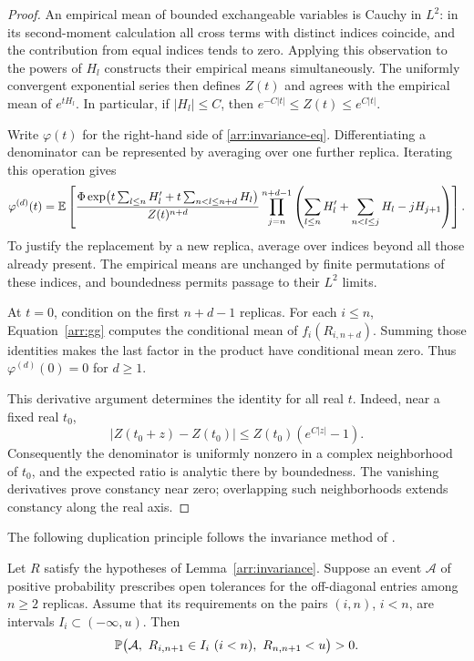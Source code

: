 \begin{proof}
An empirical mean of bounded exchangeable variables is Cauchy in $L^2$:
in its second-moment calculation all cross terms with distinct indices
coincide, and the contribution from equal indices tends to zero. Applying
this observation to the powers of $H_l$ constructs their empirical means
simultaneously. The uniformly convergent exponential series then defines
$Z(t)$ and agrees with the empirical mean of $e^{tH_l}$. In particular,
if $|H_l|\leq C$, then
$e^{-C|t|}\leq Z(t)\leq e^{C|t|}$.

Write $\varphi(t)$ for the right-hand side of
\eqref{arr:invariance-eq}. Differentiating a denominator can be represented
by averaging over one further replica. Iterating this operation gives
\[
 \varphi^{(d)}(t)
 =\mathbb E\left[
 \frac{\Phi\exp\bigl(t\sum_{l\leq n}H'_l
                   +t\sum_{n<l\leq n+d}H_l\bigr)}
      {Z(t)^{n+d}}
 \prod_{j=n}^{n+d-1}
 \left(\sum_{l\leq n}H'_l+
       \sum_{n<l\leq j}H_l-jH_{j+1}\right)
 \right].
\]
To justify the replacement by a new replica, average over indices beyond
all those already present. The empirical means are unchanged by finite
permutations of these indices, and boundedness permits passage to their
$L^2$ limits.

At $t=0$, condition on the first $n+d-1$ replicas. For each
$i\leq n$, Equation~\eqref{arr:gg} computes the conditional mean of
$f_i(R_{i,n+d})$. Summing those identities makes the last factor in the
product have conditional mean zero. Thus $\varphi^{(d)}(0)=0$ for
$d\geq1$.

This derivative argument determines the identity for all real $t$.
Indeed, near a fixed real $t_0$,
\[
 |Z(t_0+z)-Z(t_0)|
 \leq Z(t_0)(e^{C|z|}-1).
\]
Consequently the denominator is uniformly nonzero in a complex
neighborhood of $t_0$, and the expected ratio is analytic there by
boundedness. The vanishing derivatives prove constancy near zero;
overlapping such neighborhoods extends constancy along the real axis.
\end{proof}

The following duplication principle follows the invariance method of
\cite[Theorem~4 in the cited arXiv version]{PanchenkoUltra}.

\begin{lemma}[Duplication]\label{arr:duplication}
Let $R$ satisfy the hypotheses of Lemma~\ref{arr:invariance}.
Suppose an event $\mathcal A$ of positive probability prescribes open
tolerances for the off-diagonal entries among $n\geq2$ replicas.
Assume that its requirements on the pairs $(i,n)$, $i<n$, are intervals
$I_i\subset(-\infty,u)$. Then
\[
 \mathbb P\bigl(\mathcal A,\ R_{i,n+1}\in I_i\ (i<n),\
                         R_{n,n+1}<u\bigr)>0.
\]
\end{lemma}

